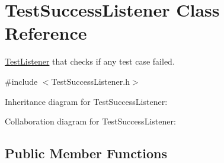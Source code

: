 \hypertarget{class_test_success_listener}{\section{Test\+Success\+Listener Class Reference}
\label{class_test_success_listener}
}


\hyperlink{class_test_listener}{Test\+Listener} that checks if any test case failed.  




{\ttfamily \#include $<$Test\+Success\+Listener.\+h$>$}



Inheritance diagram for Test\+Success\+Listener\+:


Collaboration diagram for Test\+Success\+Listener\+:
\subsection*{Public Member Functions}
